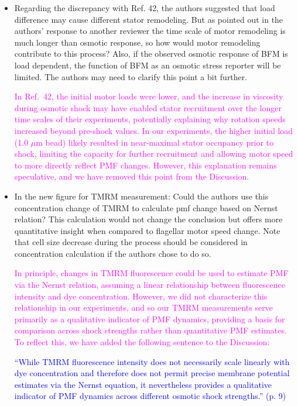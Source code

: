 \documentclass[11pt, letterpaper]{article}%
\newcommand{\revised}{\textcolor{blue}}
\newcommand{\response}{\textcolor{magenta}}
\begin{document}
\begin{itemize}
    \item Regarding the discrepancy with Ref. 42, the authors suggested that load difference may cause different stator remodeling. But as pointed out in the authors' response to another reviewer the time scale of motor remodeling is much longer than osmotic response, so how would motor remodeling contribute to this process? Also, if the observed osmotic response of BFM is load dependent, the function of BFM as an osmotic stress reporter will be limited. The authors may need to clarify this point a bit further.

    \response{In Ref.~42, the initial motor loads were lower, and the increase in viscosity during osmotic shock may have enabled stator recruitment over the longer time scales of their experiments, potentially explaining why rotation speeds increased beyond pre-shock values. In our experiments, the higher initial load (1.0 $\mu$m bead) likely resulted in near-maximal stator occupancy prior to shock, limiting the capacity for further recruitment and allowing motor speed to more directly reflect PMF changes. However, this explanation remains speculative, and we have removed this point from the Discussion.}

    \item In the new figure for TMRM measurement: Could the authors use this concentration change of TMRM to calculate pmf change based on Nernst relation? This calculation would not change the conclusion but offers more quantitative insight when compared to flagellar motor speed change. Note that cell size decrease during the process should be considered in concentration calculation if the authors chose to do so.

    \response{In principle, changes in TMRM fluorescence could be used to estimate PMF via the Nernst relation, assuming a linear relationship between fluorescence intensity and dye concentration. However, we did not characterize this relationship in our experiments, and so our TMRM measurements serve primarily as a qualitative indicator of PMF dynamics, providing a basis for comparison across shock strengths rather than quantitative PMF estimates. To reflect this, we have added the following sentence to the Discussion:}

\begin{mdframed}
\footnotesize\revised{``While TMRM fluorescence intensity does not necessarily scale linearly with dye concentration and therefore does not permit precise membrane potential estimates via the Nernst equation, it nevertheless provides a qualitative indicator of PMF dynamics across different osmotic shock strengths.'' (p. 9)}
\end{mdframed}
    
\end{itemize}
\end{document}
